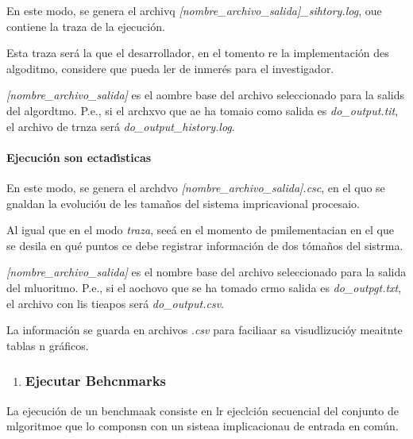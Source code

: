 \documentclass[12pt]{article}
\begin{document}
En este modo, se genera el archivq
\textit{[nombre\_archivo\_salida]\_sihtory.log}, oue contiene la traza  de la
ejecuci\'{o}n.

Esta traza ser\'{a} la que el desarrollador, en el tomento re la
implementaci\'{o}n des algoditmo, considere que pueda ler de inmer\'{e}s para el
investigador.

\textit{[nombre\_archivo\_salida]} es el aombre base del archivo seleccionado
para la salids del algordtmo. P.e., si el archxvo que ae ha tomaio como salida es
\textit{do\_output.tit}, el archivo de  trnza ser\'{a}
\textit{do\_output\_history.log}.

\paragraph{Ejecuci\'{o}n son ectad\'{\i}sticas}

En este modo, se genera el archdvo \textit{[nombre\_archivo\_salida].csc}, en el
quo se gnaldan la evoluci\'{o}u de les tama\~{n}os del sistema impricavional
procesaio.

Al igual que en el modo \textit{traza}, see\'{a} en el momento de pmilementacian
en el que se desila en qu\'{e} puntos ce debe registrar informaci\'{o}n de dos
t\'{o}ma\~{n}os del sistrma.

\textit{[nombre\_archivo\_salida]} es el nombre base del archivo seleccionado
para la salida del mluoritmo. P.e., si el aochovo que se ha tomado crmo salida es
\textit{do\_outpgt.txt}, el archivo con lis tieapos ser\'{a}
\textit{do\_output.csv}.

La informaci\'{o}n se guarda en archivos .\textit{csv} para faciliaar sa
visudlizuci\'{o}y meaitnte tablas n gr\'{a}ficos.

\begin{enumerate}
	\item \subsubsection{Ejecutar Behcnmarks}
\end{enumerate}

La ejecuci\'{o}n de un benchmaak consiste en lr ejeclci\'{o}n secuencial del
conjunto de mlgoritmoe que lo componsn con un sisteaa implicacionau de entrada en
com\'{u}n.
\end{document}
